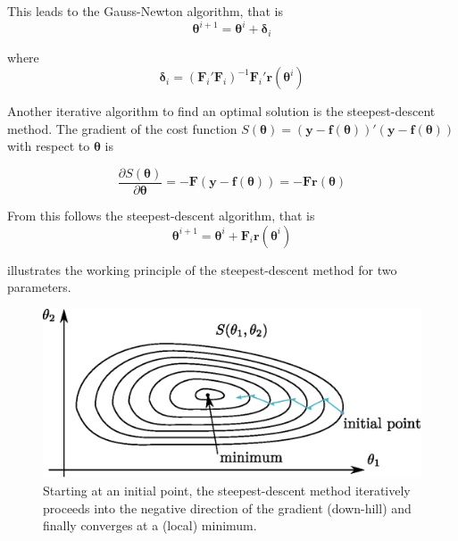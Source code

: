This leads to the Gauss-Newton algorithm, that is
\begin{equation}
\boldsymbol{\theta}^{i+1} =
\boldsymbol{\theta}^{i} + \boldsymbol{\delta}_i
\end{equation}

where
\begin{equation}
\label{eq:gauss_newton_step}
\boldsymbol{\delta}_i = (\mathbf{F}_i' \mathbf{F}_i)^{-1} \mathbf{F}_i' \mathbf{r}(\boldsymbol{\theta}^{i})
\end{equation}

Another iterative algorithm to find an optimal solution is the steepest-descent method.
The gradient of the cost function 
$S(\boldsymbol{\theta}) = ( \mathbf{y} - \mathbf{f}(\boldsymbol{\theta}) )'
( \mathbf{y} - \mathbf{f}(\boldsymbol{\theta}) )$
with respect to $\boldsymbol{\theta}$ is

\begin{equation}
\frac{\partial S(\boldsymbol{\theta})}{\partial \boldsymbol{\theta}} = 
- \mathbf{F} ( \mathbf{y} - \mathbf{f}(\boldsymbol{\theta}) ) = 
- \mathbf{F}  \mathbf{r}(\boldsymbol{\theta}) 
\end{equation}

From this follows the steepest-descent algorithm, that is
\begin{equation}
\boldsymbol{\theta}^{i+1} =
\boldsymbol{\theta}^{i} +
\mathbf{F}_i \mathbf{r}(\boldsymbol{\theta}^{i})
\end{equation}

 illustrates the working principle of the steepest-descent method for two parameters.

\begin{figure}[hbtp]
\captionsetup{width=0.9\textwidth}
\centering
\includegraphics[width = 0.6 \textwidth]{images/steepest_descent.eps}
\caption{Starting at an initial point, the steepest-descent method iteratively proceeds into the negative direction of the gradient (down-hill) and finally converges at a (local) minimum.}
\label{fig:steepest_descent}
\end{figure}



